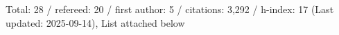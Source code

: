 Total: 28 / refereed: 20 / first author: 5 / citations: 3,292 / h-index: 17 (Last updated: 2025-09-14), List attached below